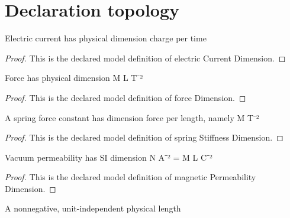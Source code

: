 \section{Declaration topology}
\begin{definition}
  \label{def:physics:phyx-mini-0968:phyxminiproblems-problemphyxmini0968-electriccurrentdimension}
  Electric current has physical dimension charge per time
\end{definition}
\begin{proof}
  This is the declared model definition of electric Current Dimension.
\end{proof}
\begin{definition}
  \label{def:physics:phyx-mini-0968:phyxminiproblems-problemphyxmini0968-forcedimension}
  Force has physical dimension M L T⁻²
\end{definition}
\begin{proof}
  This is the declared model definition of force Dimension.
\end{proof}
\begin{definition}
  \label{def:physics:phyx-mini-0968:phyxminiproblems-problemphyxmini0968-springstiffnessdimension}
  A spring force constant has dimension force per length, namely M T⁻²
\end{definition}
\begin{proof}
  This is the declared model definition of spring Stiffness Dimension.
\end{proof}
\begin{definition}
  \label{def:physics:phyx-mini-0968:phyxminiproblems-problemphyxmini0968-magneticpermeabilitydimension}
  Vacuum permeability has SI dimension N A⁻² = M L C⁻²
\end{definition}
\begin{proof}
  This is the declared model definition of magnetic Permeability Dimension.
\end{proof}
\begin{definition}
  \label{def:physics:phyx-mini-0968:phyxminiproblems-problemphyxmini0968-lengthmagnitude}
  A nonnegative, unit-independent physical length
\end{definition}
